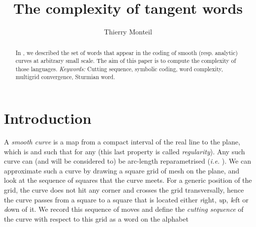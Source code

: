 \documentclass[preliminary]{eptcs}
\author{Thierry Monteil
\institute{CNRS -- Université Montpellier 2\\
\burl{http://www.lirmm.fr/~monteil}}
}
\title{The complexity of tangent words}
\date{}
\begin{document}
\newcommand{\qed}{\hfill }

\maketitle


\begin{abstract}
In \cite{MonteilDGCI2011}, we described the set of words that appear in
the coding of smooth (resp. analytic) curves at arbitrary small scale. The
aim of this paper is to compute the complexity of those languages.
\newline \newline
\emph{Keywords:} Cutting sequence, symbolic coding, word complexity,
multigrid convergence, Sturmian word.
\end{abstract}


\section{Introduction}


A \emph{smooth curve} is a map  from a compact interval  of the
real line to the plane, which is  and such that  for any  (this last property is called \emph{regularity}).
Any such curve can (and will be considered to) be arc-length
reparametrised (\emph{i.e.} ).
\newline
We can approximate such a curve by drawing a square grid of mesh  on
the plane, and look at the sequence of squares that the curve meets.
For a generic position of the grid, the curve  does not hit any
corner and crosses the grid transversally, hence the curve passes from a
square to a square that is located either \emph{r}ight, \emph{u}p,
\emph{l}eft or \emph{d}own of it.
We record this sequence of moves and define the \emph{cutting sequence} of
the curve  with respect to this grid as a word  on the alphabet 
\end{document}
